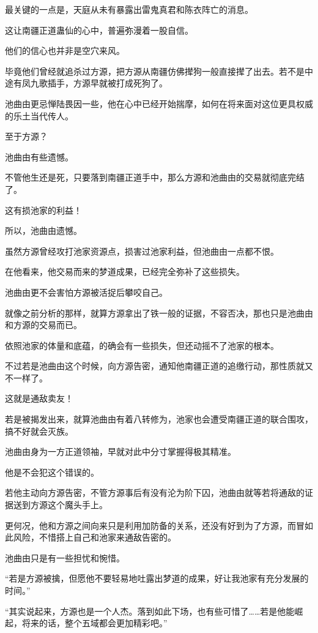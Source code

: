 \begin{this_body}
最关键的一点是，天庭从未有暴露出雷鬼真君和陈衣阵亡的消息。

这让南疆正道蛊仙的心中，普遍弥漫着一股自信。

他们的信心也并非是空穴来风。

毕竟他们曾经就追杀过方源，把方源从南疆仿佛撵狗一般直接撵了出去。若不是中途有凤九歌插手，方源早就被打成死狗了。

池曲由更忌惮陆畏因一些，他在心中已经开始揣摩，如何在将来面对这位更具权威的乐土当代传人。

至于方源？

池曲由有些遗憾。

不管他生还是死，只要落到南疆正道手中，那么方源和池曲由的交易就彻底完结了。

这有损池家的利益！

所以，池曲由遗憾。

虽然方源曾经攻打池家资源点，损害过池家利益，但池曲由一点都不恨。

在他看来，他交易而来的梦道成果，已经完全弥补了这些损失。

池曲由更不会害怕方源被活捉后攀咬自己。

就像之前分析的那样，就算方源拿出了铁一般的证据，不容否决，那也只是池曲由和方源的交易而已。

依照池家的体量和底蕴，的确会有一些损失，但还动摇不了池家的根本。

不过若是池曲由这个时候，向方源告密，通知他南疆正道的追缴行动，那性质就又不一样了。

这就是通敌卖友！

若是被揭发出来，就算池曲由有着八转修为，池家也会遭受南疆正道的联合围攻，搞不好就会灭族。

池曲由身为一方正道领袖，早就对此中分寸掌握得极其精准。

他是不会犯这个错误的。

若他主动向方源告密，不管方源事后有没有沦为阶下囚，池曲由就等若将通敌的证据送到方源这个魔头手上。

更何况，他和方源之间向来只是利用加防备的关系，还没有好到为了方源，而冒如此风险，不惜搭上自己和池家来通敌告密的。

池曲由只是有一些担忧和惋惜。

“若是方源被擒，但愿他不要轻易地吐露出梦道的成果，好让我池家有充分发展的时间。”

“其实说起来，方源也是一个人杰。落到如此下场，也有些可惜了……若是他能崛起，将来的话，整个五域都会更加精彩吧。”


\end{this_body}
